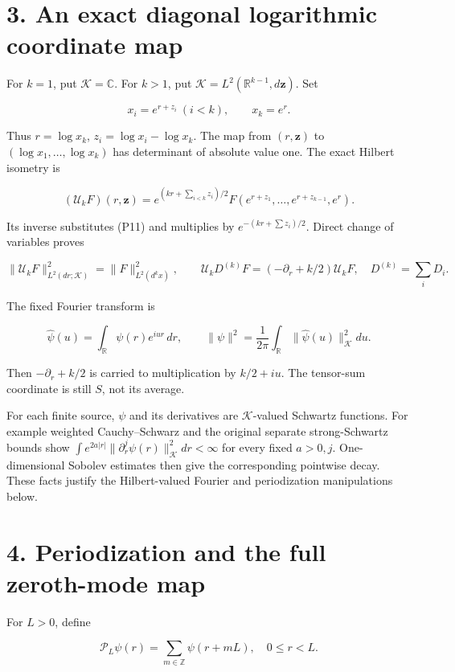 \documentclass[
]{article}
\begin{document}
\section{3. An exact diagonal logarithmic coordinate
map}\label{an-exact-diagonal-logarithmic-coordinate-map}

For \(k=1\), put \(\mathcal K=\mathbb C\). For \(k>1\), put
\(\mathcal K=L^2(\mathbb R^{k-1},d\mathbf z)\). Set

\[
x_i=e^{r+z_i}\ (i<k),\qquad x_k=e^r.
\tag{P11}
\]

Thus \(r=\log x_k\), \(z_i=\log x_i-\log x_k\). The map from
\((r,\mathbf z)\) to \((\log x_1,\ldots,\log x_k)\) has determinant of
absolute value one. The exact Hilbert isometry is

\[
(\mathcal U_kF)(r,\mathbf z)
=e^{(kr+\sum_{i<k}z_i)/2}
F(e^{r+z_1},\ldots,e^{r+z_{k-1}},e^r).
\tag{P12}
\]

Its inverse substitutes (P11) and multiplies by
\(e^{-(kr+\sum z_i)/2}\). Direct change of variables proves

\[
\|\mathcal U_kF\|^2_{L^2(dr;\mathcal K)}
=\|F\|^2_{L^2(d^kx)},\qquad
\mathcal U_kD^{(k)}F=(-\partial_r+k/2)\mathcal U_kF,
\quad D^{(k)}=\sum_iD_i.
\tag{P13}
\]

The fixed Fourier transform is

\[
\widehat\psi(u)=\int_{\mathbb R}\psi(r)e^{iur}\,dr,
\qquad
\|\psi\|^2=\frac1{2\pi}\int_{\mathbb R}\|\widehat\psi(u)\|_{\mathcal K}^2du.
\tag{P14}
\]

Then \(-\partial_r+k/2\) is carried to multiplication by \(k/2+iu\). The
tensor-sum coordinate is still \(S\), not its average.

For each finite source, \(\psi\) and its derivatives are
\(\mathcal K\)-valued Schwartz functions. For example weighted
Cauchy--Schwarz and the original separate strong-Schwartz bounds show
\(\int e^{2a|r|}\|\partial_r^j\psi(r)\|_{\mathcal K}^2dr<\infty\) for
every fixed \(a>0,j\). One-dimensional Sobolev estimates then give the
corresponding pointwise decay. These facts justify the Hilbert-valued
Fourier and periodization manipulations below.

\section{4. Periodization and the full zeroth-mode
map}\label{periodization-and-the-full-zeroth-mode-map}

For \(L>0\), define

\[
\mathcal P_L\psi(r)=\sum_{m\in\mathbb Z}\psi(r+mL),\quad 0\le r<L.
\tag{P15}
\]
\end{document}
